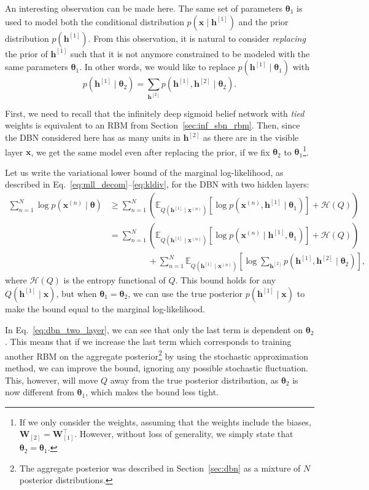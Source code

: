 \documentclass[dissertation,nocontribution,draft*]{aaltoseries}
\newcommand{\qlay}[1]{\left[#1\right]}
\newcommand{\vect}[1]{\mathbf{#1}}
\newcommand{\vects}[1]{\boldsymbol{#1}}
\newcommand{\matr}[1]{\mathbf{#1}}
\newcommand{\vh}[0]{\vect{h}}
\newcommand{\vx}[0]{\vect{x}}
\newcommand{\mW}[0]{\matr{W}}
\newcommand{\TT}[0]{{\vects{\theta}}}
\newcommand{\HH}[0]{\mathcal{H}}
\newcommand{\E}[0]{\mathbb{E}}
\begin{document}
An interesting observation can be made here.  The same set
of parameters $\TT_1$ is used to model both the
conditional distribution $p(\vx \mid \vh^{\qlay{1}})$ and the
prior distribution $p(\vh^{\qlay{1}})$. From this observation, it
is natural to consider \textit{replacing} the prior of
$\vh^{\qlay{1}}$ such that it is not anymore constrained to be
modeled with the same parameters $\TT_1$.
In other words, we would like to replace
$p(\vh^{\qlay{1}} \mid \TT_1)$ with
\[
p(\vh^{\qlay{1}} \mid \TT_2) = \sum_{\vh^{\qlay{2}}}
p(\vh^{\qlay{1}},
\vh^{\qlay{2}} \mid \TT_2).
\]

First, we need to recall that the infinitely deep sigmoid
belief network with \textit{tied} weights is equivalent to
an RBM from Section~\ref{sec:inf_sbn_rbm}. Then, since the DBN
considered here has as many units in $\vh^{\qlay{2}}$ as there
are in the visible layer $\vx$, we get the same model even
after replacing the prior, if we fix $\TT_2$ to
$\TT_1$\footnote{ If we only consider the weights, assuming
that the weights include the biases,
$\mW_{\qlay{2}}=\mW_{\qlay{1}}^\top$.
However, without loss of generality, we simply state that
$\TT_2=\TT_1$.  }.

Let us write the variational lower bound of the marginal
log-likelihood, as described in
Eq.~\eqref{eq:mll_decom}--\eqref{eq:kldiv}, for the DBN with
two hidden layers:
\begin{align}
    \label{eq:dbn_two_layer}
    \sum_{n=1}^N \log p(\vx^{(n)} \mid \TT) &\geq
    \sum_{n=1}^N \left(\E_{Q(\vh^{\qlay{1}} \mid \vx^{(n)})} \left[
    \log p(\vx^{(n)}, \vh^{\qlay{1}} \mid \TT_1)
    \right] + \HH(Q)\right) 
    \nonumber \\
    &= \sum_{n=1}^N \left(\E_{Q(\vh^{\qlay{1}} \mid \vx^{(n)})} \left[
    \log p(\vx^{(n)} \mid \vh^{\qlay{1}}, \TT_1) \right] +
    \HH(Q)\right)
    \nonumber \\
    &\phantom{= \sum_{n=1}^N} + \sum_{n=1}^N
    \E_{Q(\vh^{\qlay{1}} \mid \vx^{(n)})} \left[ \log
    \sum_{\vh^{\qlay{2}}} p(\vh^{\qlay{1}}, \vh^{\qlay{2}} \mid \TT_2) \right]
    ,
\end{align}
where $\HH(Q)$ is the entropy functional of $Q$. This bound
holds for any $Q(\vh^{\qlay{1}} \mid \vx)$, but when $\TT_1 =
\TT_2$, we can use the true posterior $p(\vh^{\qlay{1}} \mid
\vx)$ to make the bound equal to the marginal
log-likelihood.

In Eq.~\eqref{eq:dbn_two_layer}, we can see that only the
last term is dependent on $\TT_2$. This means that if we
increase the last term which corresponds to training another
RBM on the aggregate posterior\footnote{The aggregate
posterior was described in Section~\ref{sec:dbn} as a
mixture of $N$ posterior distributions.} by using the
stochastic approximation method, we can improve the bound,
ignoring any possible stochastic fluctuation. 
This, however, will move $Q$ away from the true posterior
distribution, as $\TT_2$ is now different from $\TT_1$,
which makes the bound less tight.
\end{document}
